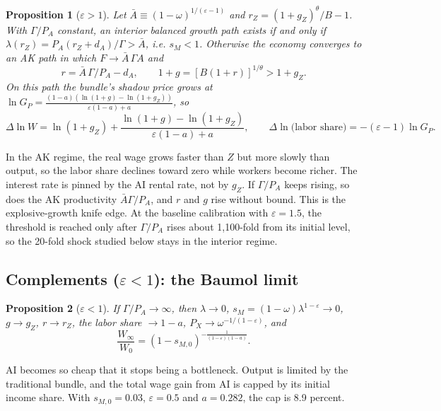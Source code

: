 \documentclass[11pt]{article}
\newtheorem{proposition}{Proposition}
\newcommand{\e}{\varepsilon}
\begin{document}
\begin{proposition}[$\e>1$]
Let $\bar A\equiv(1-\omega)^{1/(\e-1)}$ and $r_Z=(1+g_Z)^\theta/B-1$. With $\Gamma/P_A$
constant, an interior balanced growth path exists if and only if
$\lambda(r_Z)=P_A(r_Z+d_A)/\Gamma>\bar A$, i.e. $s_M<1$. Otherwise the economy converges
to an AK path in which $F\to\bar A\,\Gamma A$ and
\begin{equation}
r = \bar A\,\Gamma/P_A - d_A,\qquad 1+g = [B(1+r)]^{1/\theta} > 1+g_Z .
\end{equation}
On this path the bundle's shadow price grows at
$\ln G_P = \frac{(1-a)(\ln(1+g)-\ln(1+g_Z))}{\e(1-a)+a}$, so
\begin{equation}
\Delta\ln W = \ln(1+g_Z) + \frac{\ln(1+g)-\ln(1+g_Z)}{\e(1-a)+a},\qquad
\Delta\ln\text{(labor share)} = -(\e-1)\ln G_P .
\end{equation}
\end{proposition}

In the AK regime, the real wage grows faster than $Z$ but more slowly than output, so
the labor share declines toward zero while workers become richer. The interest rate is
pinned by the AI rental rate, not by $g_Z$. If $\Gamma/P_A$ keeps rising, so does the AK
productivity $\bar A\Gamma/P_A$, and $r$ and $g$ rise without bound. This is the
explosive-growth knife edge. At the baseline calibration with $\e=1.5$, the threshold is
reached only after $\Gamma/P_A$ rises about 1{,}100-fold from its initial level, so the
20-fold shock studied below stays in the interior regime.

\subsection{\texorpdfstring{Complements ($\e<1$)}{Complements (epsilon < 1)}: the Baumol limit}

\begin{proposition}[$\e<1$]
If $\Gamma/P_A\to\infty$, then $\lambda\to0$, $s_M=(1-\omega)\lambda^{1-\e}\to0$, $g\to g_Z$,
$r\to r_Z$, the labor share $\to 1-a$, $P_X\to\omega^{-1/(1-\e)}$, and
\begin{equation}
\frac{W_\infty}{W_0} = (1-s_{M,0})^{-\frac{1}{(1-\e)(1-a)}} .
\end{equation}
\end{proposition}

AI becomes so cheap that it stops being a bottleneck. Output is limited by the
traditional bundle, and the total wage gain from AI is capped by its initial income
share. With $s_{M,0}=0.03$, $\e=0.5$ and $a=0.282$, the cap is 8.9 percent.
\end{document}
